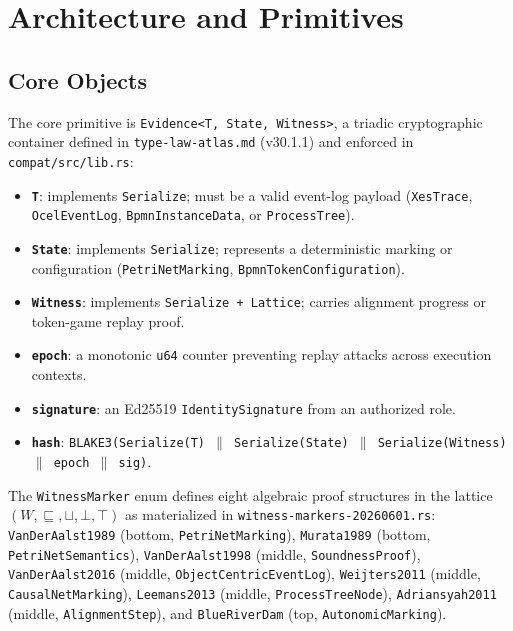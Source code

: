 
\section{Architecture and Primitives}
\label{sec:sources-wasm4pm-compat-architecture}

\subsection{Core Objects}
\label{sec:sources-wasm4pm-compat-architecture-objects}

The core primitive is \texttt{Evidence<T, State, Witness>}, a triadic cryptographic
container defined in \texttt{type-law-atlas.md} (v30.1.1) and enforced in
\texttt{compat/src/lib.rs}:

\begin{itemize}
  \item \textbf{\texttt{T}}: implements \texttt{Serialize}; must be a valid event-log
    payload (\texttt{XesTrace}, \texttt{OcelEventLog}, \texttt{BpmnInstanceData}, or
    \texttt{ProcessTree}).
  \item \textbf{\texttt{State}}: implements \texttt{Serialize}; represents a deterministic
    marking or configuration (\texttt{PetriNetMarking}, \texttt{BpmnTokenConfiguration}).
  \item \textbf{\texttt{Witness}}: implements \texttt{Serialize + Lattice}; carries alignment
    progress or token-game replay proof.
  \item \textbf{\texttt{epoch}}: a monotonic \texttt{u64} counter preventing replay attacks
    across execution contexts.
  \item \textbf{\texttt{signature}}: an Ed25519 \texttt{IdentitySignature} from an
    authorized role.
  \item \textbf{\texttt{hash}}: \texttt{BLAKE3(Serialize(T) \(\parallel\) Serialize(State)
    \(\parallel\) Serialize(Witness) \(\parallel\) epoch \(\parallel\) sig)}.
\end{itemize}

The \texttt{WitnessMarker} enum defines eight algebraic proof structures in the lattice
$(W, \sqsubseteq, \sqcup, \bot, \top)$ as materialized in
\texttt{witness-markers-20260601.rs}: \texttt{VanDerAalst1989} (bottom,
\texttt{PetriNetMarking}), \texttt{Murata1989} (bottom, \texttt{PetriNetSemantics}),
\texttt{VanDerAalst1998} (middle, \texttt{SoundnessProof}), \texttt{VanDerAalst2016}
(middle, \texttt{ObjectCentricEventLog}), \texttt{Weijters2011} (middle,
\texttt{CausalNetMarking}), \texttt{Leemans2013} (middle, \texttt{ProcessTreeNode}),
\texttt{Adriansyah2011} (middle, \texttt{AlignmentStep}), and
\texttt{BlueRiverDam} (top, \texttt{AutonomicMarking}).

